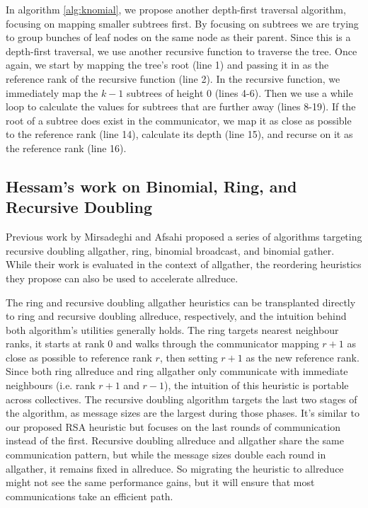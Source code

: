 In algorithm \ref{alg:knomial}, we propose another depth-first traversal algorithm, focusing on mapping smaller subtrees first.
By focusing on subtrees we are trying to group bunches of leaf nodes on the same node as their parent.
Since this is a depth-first traversal, we use another recursive function to traverse the tree. 
Once again, we start by mapping the tree's root (line 1) and passing it in as the reference rank of the recursive function (line 2).
In the recursive function, we immediately map the $k-1$ subtrees of height 0 (lines 4-6).
Then we use a while loop to calculate the values for subtrees that are further away (lines 8-19).
If the root of a subtree does exist in the communicator, we map it as close as possible to the reference rank (line 14), calculate its depth (line 15), and recurse on it as the reference rank (line 16).




\subsection{Hessam's work on Binomial, Ring, and Recursive Doubling}

Previous work by Mirsadeghi and Afsahi \cite{Mirsadeghi2016TopoAwareCollRR} proposed a series of algorithms targeting recursive doubling allgather, ring, binomial broadcast, and binomial gather. 
While their work is evaluated in the context of allgather, the reordering heuristics they propose can also be used to accelerate allreduce. 

The ring and recursive doubling allgather heuristics can be transplanted directly to ring and recursive doubling allreduce, respectively, and the intuition behind both algorithm's utilities generally holds. 
The ring targets nearest neighbour ranks, it starts at rank 0 and walks through the communicator mapping $r+1$ as close as possible to reference rank $r$, then setting $r+1$ as the new reference rank.
Since both ring allreduce and ring allgather only communicate with immediate neighbours (i.e. rank $r+1$ and $r-1$), the intuition of this heuristic is portable across collectives.
The recursive doubling algorithm targets the last two stages of the algorithm, as message sizes are the largest during those phases. 
It's similar to our proposed RSA heuristic but focuses on the last rounds of communication instead of the first. 
Recursive doubling allreduce and allgather share the same communication pattern, but while the message sizes double each round in allgather,  it remains fixed in allreduce.
So migrating the heuristic to allreduce might not see the same performance gains, but it will ensure that most communications take an efficient path.


